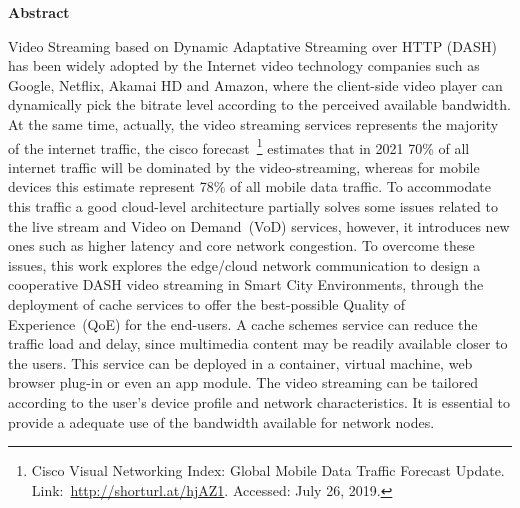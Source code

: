 \begin{center}
	{\large {\bf Abstract}}
\end{center}

Video Streaming based on Dynamic Adaptative Streaming over HTTP (DASH) has been widely adopted by the Internet video technology companies such as Google, Netflix, Akamai HD and Amazon, where the client-side video player can dynamically pick the bitrate level according to the perceived available bandwidth. 
At the same time, actually, the video streaming services represents the majority of the internet traffic, the cisco forecast~\footnote{Cisco Visual Networking Index: Global Mobile Data Traffic Forecast Update. Link:~\url{http://shorturl.at/hjAZ1}. Accessed: July 26, 2019.} estimates that in 2021 70\% of all internet traffic will be dominated by the video-streaming, whereas for mobile devices this estimate represent 78\% of all mobile data traffic. To accommodate this traffic %
a good cloud-level architecture partially solves some issues related to the live stream and Video on Demand~(VoD) services, however, it introduces new ones such as higher latency and core network congestion. 
To overcome these issues, this work explores the edge/cloud network communication to design a cooperative DASH video streaming in Smart City Environments, through the deployment of cache services to offer the best-possible Quality of Experience~(QoE) for the end-users. A cache schemes service can reduce the traffic load and delay, since multimedia content may be readily available closer to the users. This service can be deployed in a container, virtual machine, web browser plug-in or even an app module. The video streaming can be tailored according to the user's device profile and network characteristics. It is essential to provide a adequate use of the bandwidth available for network nodes. %
